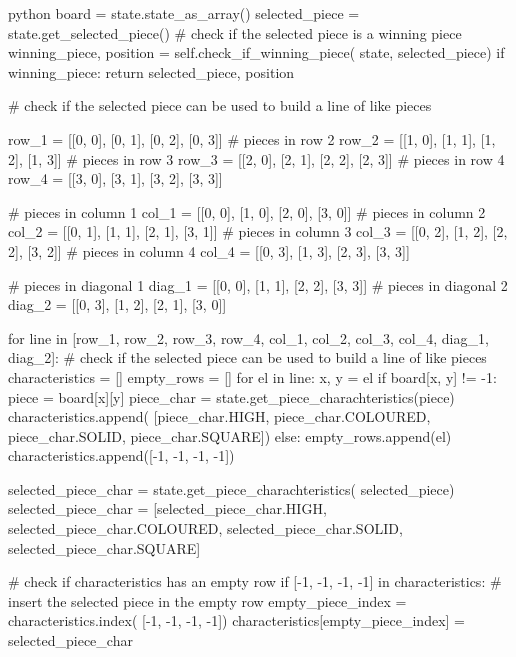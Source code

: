 \begin{mintedbox}{python}
        board = state.state_as_array()
        selected_piece = state.get_selected_piece()
        # check if the selected piece is a winning piece
        winning_piece, position = self.check_if_winning_piece(
            state, selected_piece)
        if winning_piece:
            return selected_piece, position

        # check if the selected piece can be used to build a line of like pieces

        row_1 = [[0, 0], [0, 1], [0, 2], [0, 3]]
        # pieces in row 2
        row_2 = [[1, 0], [1, 1], [1, 2], [1, 3]]
        # pieces in row 3
        row_3 = [[2, 0], [2, 1], [2, 2], [2, 3]]
        # pieces in row 4
        row_4 = [[3, 0], [3, 1], [3, 2], [3, 3]]

        # pieces in column 1
        col_1 = [[0, 0], [1, 0], [2, 0], [3, 0]]
        # pieces in column 2
        col_2 = [[0, 1], [1, 1], [2, 1], [3, 1]]
        # pieces in column 3
        col_3 = [[0, 2], [1, 2], [2, 2], [3, 2]]
        # pieces in column 4
        col_4 = [[0, 3], [1, 3], [2, 3], [3, 3]]

        # pieces in diagonal 1
        diag_1 = [[0, 0], [1, 1], [2, 2], [3, 3]]
        # pieces in diagonal 2
        diag_2 = [[0, 3], [1, 2], [2, 1], [3, 0]]

        for line in [row_1, row_2, row_3, row_4, col_1, col_2, col_3, col_4, diag_1, diag_2]:
            # check if the selected piece can be used to build a line of like pieces
            characteristics = []
            empty_rows = []
            for el in line:
                x, y = el
                if board[x, y] != -1:
                    piece = board[x][y]
                    piece_char = state.get_piece_charachteristics(piece)
                    characteristics.append(
                        [piece_char.HIGH, piece_char.COLOURED, piece_char.SOLID, piece_char.SQUARE])
                else:
                    empty_rows.append(el)
                    characteristics.append([-1, -1, -1, -1])

            selected_piece_char = state.get_piece_charachteristics(
                selected_piece)
            selected_piece_char = [selected_piece_char.HIGH, selected_piece_char.COLOURED,
                                    selected_piece_char.SOLID, selected_piece_char.SQUARE]

            # check if characteristics has an empty row
            if [-1, -1, -1, -1] in characteristics:
                # insert the selected piece in the empty row
                empty_piece_index = characteristics.index(
                    [-1, -1, -1, -1])
                characteristics[empty_piece_index] = selected_piece_char


\end{mintedbox}
